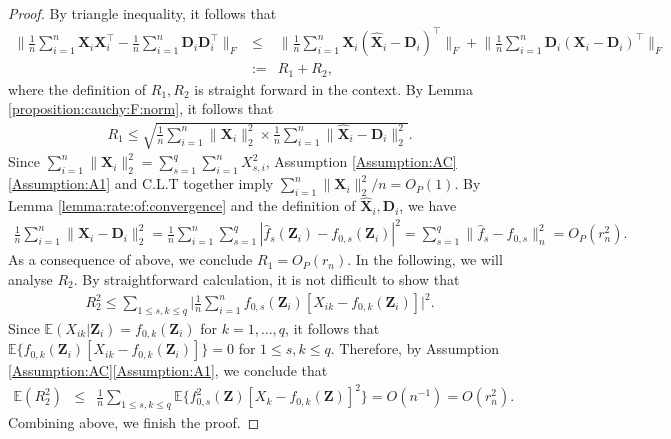 \documentclass[11pt, preprint]{imsart}
\numberwithin{equation}{section}
\def \bfD{\mathbf{D}}
\def \bfX{\mathbf{X}}
\def \bfZ{\mathbf{Z}}
\def \bfD{\mathbf{D}}
\def \ev{\mathbb{E}}
\theoremstyle{plain}
\theoremstyle{definition}
\begin{document}
\begin{proof}
By triangle inequality, it follows that
\begin{eqnarray*}
	\bigg\|\frac{1}{n}\sum_{i=1}^n\widehat{\bfX}_i{\bfX}_i^\top-\frac{1}{n}\sum_{i=1}^n\bfD_i\bfD_i^\top\bigg\|_F\nonumber&\leq&\bigg\|\frac{1}{n}\sum_{i=1}^n{\bfX}_i(\widehat{\bfX}_i-\bfD_i)^\top\bigg\|_F+\bigg\|\frac{1}{n}\sum_{i=1}^n{\bfD}_i({\bfX}_i-\bfD_i)^\top\bigg\|_F\nonumber\\
	&:=&R_1+R_2,
\end{eqnarray*}
where the definition of $R_1, R_2$ is straight forward in the context. By Lemma \ref{proposition:cauchy:F:norm}, it follows that
\begin{eqnarray}
	R_1\leq \sqrt{\frac{1}{n}\sum_{i=1}^n\|\bfX_i\|_2^2\times \frac{1}{n}\sum_{i=1}^n\|\widehat{\bfX}_i-\bfD_i\|_2^2}.\nonumber
\end{eqnarray}
Since $\sum_{i=1}^n\|\bfX_i\|_2^2=\sum_{s=1}^q \sum_{i=1}^nX_{s,i}^2$, Assumption \ref{Assumption:AC}\ref{Assumption:A1} and C.L.T together imply $\sum_{i=1}^n\|\bfX_i\|_2^2/n=O_P(1)$. By Lemma \ref{lemma:rate:of:convergence} and the definition of $\widehat{\bfX}_i, \bfD_i$,  we have
\begin{eqnarray}
\frac{1}{n}\sum_{i=1}^n\|\widehat{\bfX}_i-\bfD_i\|_2^2=\frac{1}{n}\sum_{i=1}^n\sum_{s=1}^{q}|\widehat{f}_{s}(\bfZ_i)-f_{0,s}(\bfZ_i)|^2=\sum_{s=1}^{q}\|\widehat{f}_{s}-f_{0,s}\|_n^2=O_P(r_n^2).\nonumber
\end{eqnarray} 
As a consequence of above, we conclude $R_1=O_P(r_n)$. In the following, we will analyse $R_2$. By straightforward calculation, it is not difficult to show that
\begin{eqnarray*}
	R_2^2\leq \sum_{1\leq s, k\leq q}\bigg|\frac{1}{n}\sum_{i=1}^n f_{0,s}(\bfZ_i)[X_{ik}-f_{0,k}(\bfZ_i)]\bigg|^2.
\end{eqnarray*}
Since $\ev(X_{ik}|\bfZ_i)=f_{0,k}(\bfZ_i)$ for $k=1,\ldots, q$, it follows that $\ev\{f_{0,k}(\bfZ_i)[X_{ik}-f_{0,k}(\bfZ_i)]\}=0$ for $1\leq s, k\leq q$. Therefore, by Assumption \ref{Assumption:AC}\ref{Assumption:A1}, we conclude that
\begin{eqnarray*}
\ev(R_2^2)&\leq& \frac{1}{n}\sum_{1\leq s,k\leq q}\ev\{f_{0,s}^2(\bfZ)[X_{k}-f_{0,k}(\bfZ)]^2\}=O(n^{-1})=O(r_n^2).
\end{eqnarray*}
Combining above, we finish the proof.
\end{proof}
\end{document}
